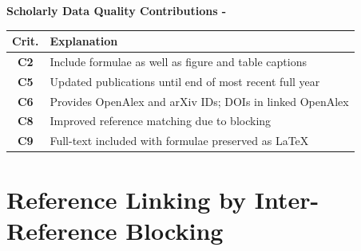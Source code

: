 \begin{infobox-progress}
      \textbf{Scholarly Data Quality Contributions - \cite{Saier2022ULITE,Saier2023unarXive}}\vspace{0.5em}

      \begin{tabular}{cp{11.3cm}}
        \toprule
        Crit. & Explanation \\
        \midrule
        \textbf{C2} & Include formulae as well as figure and table captions \\
        \textbf{C5} & Updated publications until end of most recent full year \\
        \textbf{C6} & Provides OpenAlex and arXiv IDs; DOIs in linked OpenAlex \\
        \textbf{C8} & Improved reference matching due to blocking \\
        \textbf{C9} & Full-text included with formulae preserved as \LaTeX \\
        \bottomrule
      \end{tabular}
\end{infobox-progress}


\section{Reference Linking by Inter-Reference Blocking}\label{sec:covgran-blocking}

